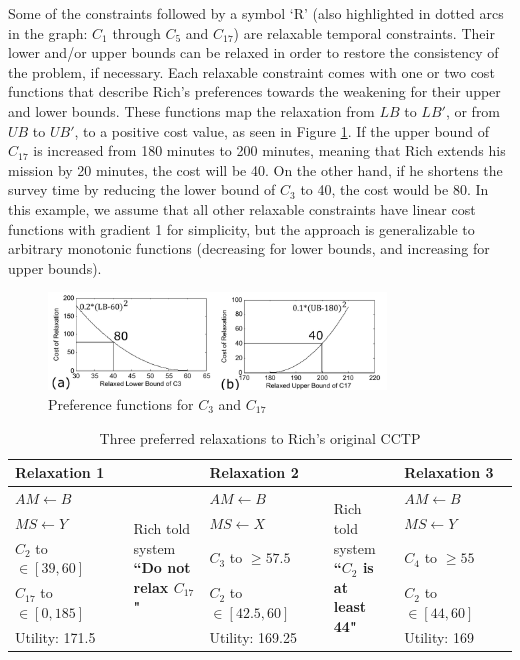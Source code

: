 \documentclass[jair,twoside,11pt,theapa]{article}
\begin{document}
Some of the constraints followed by a symbol `R' (also highlighted in dotted
arcs in the graph: $C_1$ through $C_5$ and $C_{17}$) are relaxable temporal
constraints. Their lower and/or upper bounds can be relaxed in order to restore
the consistency of the problem, if necessary. Each relaxable constraint comes
with one or two cost functions that describe Rich's preferences towards the
weakening for their upper and lower bounds. These functions map the relaxation
from $LB$ to $LB'$, or from $UB$ to $UB'$, to a positive cost value, as seen in
Figure \ref{fig:sample_pref1}. If the upper bound of $C_{17}$ is increased from
180 minutes to 200 minutes, meaning that Rich extends his mission by 20 minutes,
the cost will be 40. On the other hand, if he shortens the survey time by
reducing the lower bound of $C_3$ to 40, the cost would be 80. In this example,
we assume that all other relaxable constraints have linear cost functions with
gradient 1 for simplicity, but the approach is generalizable to arbitrary
monotonic functions (decreasing for lower bounds, and increasing for upper
bounds).


\begin{figure}[h!]
	\centering
	\includegraphics[width=0.80\textwidth]{figures/sample_pref.pdf}  
	\caption{Preference functions for $C_3$ and $C_{17}$}
	\label{fig:sample_pref1}
\end{figure}



\begin{table}[h!]
	\centering
	\begin{tabular}{| p{3cm} | p{1.8cm} | p{3cm} | p{1.8cm} | p{3cm} |}
		\hline
		\textbf{Relaxation 1} & & \textbf{Relaxation 2} & & \textbf{Relaxation 3} \\
		\hline
		$AM \leftarrow B$ &  \multirow{5}{*}{\parbox{2cm}{Rich told\\ system\\ \textbf{``Do not\\ relax $C_{17}$"}}}  & $AM \leftarrow B$ & \multirow{5}{*}{\parbox{2cm}{Rich told\\ system\\ \textbf{``$C_{2}$ is at\\ least 44"}}}  & $AM \leftarrow B$ \\
		$MS \leftarrow Y$ & & $MS \leftarrow X$ & & $MS \leftarrow Y$ \\
		$C_2$ to $\in[39,60]$ & & $C_3$ to $\geq57.5$ & & $C_4$ to $\geq55$ \\
		$C_{17}$ to $\in[0,185]$ & & $C_2$ to $\in[42.5,60]$ & & $C_2$ to $\in[44,60]$ \\
		Utility: 171.5 & & Utility: 169.25 & & Utility: 169 \\
		\hline
	\end{tabular}
	\caption{Three preferred relaxations to Rich's original CCTP}
	\label{table:relaxations}
\end{table}
\end{document}
